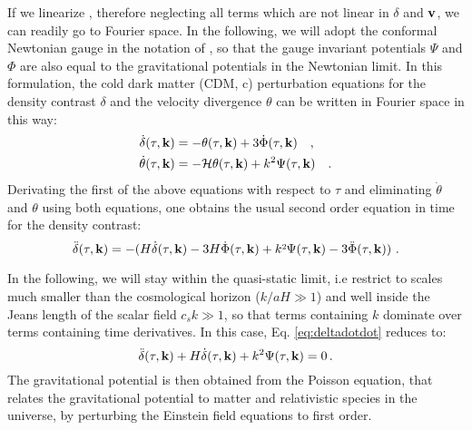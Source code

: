 If we linearize , therefore neglecting all terms which are not linear
in $\delta$ and $\mathbf{v}$, we can readily go to Fourier space.
In the following, we will adopt the conformal Newtonian gauge in the
notation of \citep{MaBertschinger}, so that the gauge invariant potentials
$\Psi$ and $\Phi$ are also equal to the gravitational potentials
in the Newtonian limit. In this formulation, the cold dark matter
(CDM, c) perturbation equations for the density contrast $\delta$
and the velocity divergence $\theta$ can be written in Fourier space
in this way: 
\begin{align}
\dot{\delta}(\tau,\mathbf{k}) & =-\theta(\tau,\mathbf{k})+3\dot\Phi(\tau,\mathbf{k})  \quad,\\
\dot{\theta}(\tau,\mathbf{k}) & =-\mathcal{H} \theta(\tau,\mathbf{k}) + k^{2}\Psi(\tau,\mathbf{k}) \quad.
\end{align}
Derivating the first of the above equations with respect to $\tau$
and eliminating $\dot{\theta}$ and $\theta$ using both equations,
one obtains the usual second order equation in time for the density
contrast: 
\begin{equation}
\ddot{\delta}(\tau,\vk k)=-(H\dot{\delta}(\tau,\vk k)-3H\dot{\Phi}(\tau,\vk k)+k\text{\texttwosuperior}\Psi(\tau,\vk k)-3\ddot{\Phi}(\tau,\vk k))\,\,.\label{eq:deltadotdot}
\end{equation}

In the following, we will stay within the quasi-static
limit, i.e restrict to scales much smaller than the cosmological horizon
($k/aH\gg1$) and well inside the Jeans length of the scalar field
$c_{s}k\gg1$, so that terms containing $k$ dominate over terms containing
time derivatives. In this case, Eq. \ref{eq:deltadotdot} reduces
to: 
\begin{equation}
\ddot{\delta}(\tau,\mathbf{k})+H\dot{\delta}(\tau,\mathbf{k})+k^{2}\Psi(\tau,\mathbf{k})=0\,.\label{eq:growth-rate-Psi}
\end{equation}
The gravitational potential is then obtained from the Poisson equation,
that relates the gravitational potential to matter and relativistic
species in the universe, by perturbing the Einstein field equations
to first order.

